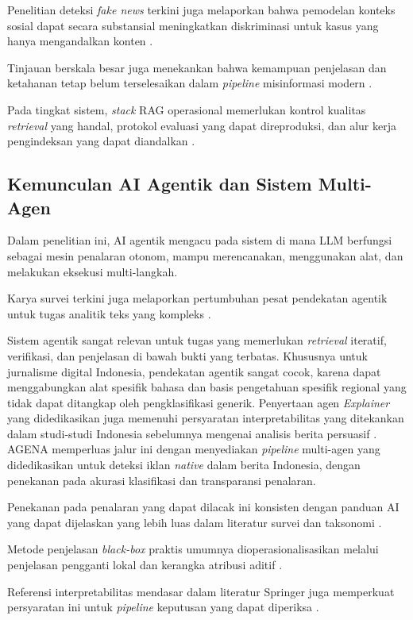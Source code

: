 \documentclass{ieeeaccess}
\begin{document}
Penelitian deteksi \textit{fake news} terkini juga melaporkan bahwa pemodelan konteks sosial dapat secara substansial meningkatkan diskriminasi untuk kasus yang hanya mengandalkan konten \cite{b67}.

Tinjauan berskala besar juga menekankan bahwa kemampuan penjelasan dan ketahanan tetap belum terselesaikan dalam \textit{pipeline} misinformasi modern \cite{b50, b57}.

Pada tingkat sistem, \textit{stack} RAG operasional memerlukan kontrol kualitas \textit{retrieval} yang handal, protokol evaluasi yang dapat direproduksi, dan alur kerja pengindeksan yang dapat diandalkan \cite{b52, b57}.

\subsection{Kemunculan AI Agentik dan Sistem Multi-Agen}
Dalam penelitian ini, AI agentik mengacu pada sistem di mana LLM berfungsi sebagai mesin penalaran otonom, mampu merencanakan, menggunakan alat, dan melakukan eksekusi multi-langkah.

Karya survei terkini juga melaporkan pertumbuhan pesat pendekatan agentik untuk tugas analitik teks yang kompleks \cite{b10}.

Sistem agentik sangat relevan untuk tugas yang memerlukan \textit{retrieval} iteratif, verifikasi, dan penjelasan di bawah bukti yang terbatas. Khususnya untuk jurnalisme digital Indonesia, pendekatan agentik sangat cocok, karena dapat menggabungkan alat spesifik bahasa dan basis pengetahuan spesifik regional yang tidak dapat ditangkap oleh pengklasifikasi generik. Penyertaan agen \textit{Explainer} yang didedikasikan juga memenuhi persyaratan interpretabilitas yang ditekankan dalam studi-studi Indonesia sebelumnya mengenai analisis berita persuasif \cite{b21}. AGENA memperluas jalur ini dengan menyediakan \textit{pipeline} multi-agen yang didedikasikan untuk deteksi iklan \textit{native} dalam berita Indonesia, dengan penekanan pada akurasi klasifikasi dan transparansi penalaran.

Penekanan pada penalaran yang dapat dilacak ini konsisten dengan panduan AI yang dapat dijelaskan yang lebih luas dalam literatur survei dan taksonomi \cite{b49, b51}.

Metode penjelasan \textit{black-box} praktis umumnya dioperasionalisasikan melalui penjelasan pengganti lokal dan kerangka atribusi aditif \cite{b64, b63}.

Referensi interpretabilitas mendasar dalam literatur Springer juga memperkuat persyaratan ini untuk \textit{pipeline} keputusan yang dapat diperiksa \cite{b59}.
\end{document}
